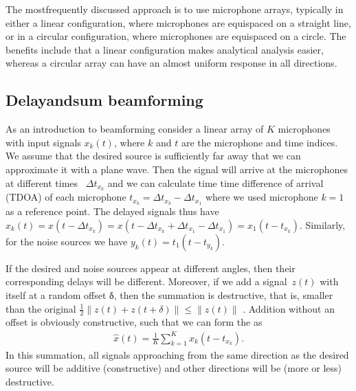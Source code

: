 \documentclass[letterpaper,10pt,english]{jupyterBook}
\begin{document}
\sphinxAtStartPar
The most\sphinxhyphen{}frequently discussed approach is to use microphone arrays,
typically in either a linear configuration, where microphones are
equi\sphinxhyphen{}spaced on a straight line, or in a circular configuration, where
microphones are equi\sphinxhyphen{}spaced on a circle. The benefits include that a
linear configuration makes analytical analysis easier, whereas a
circular array can have an almost uniform response in all directions.


\subsection{Delay\sphinxhyphen{}and\sphinxhyphen{}sum beamforming}
\label{\detokenize{Enhancement/Multi-channel_speech_enhancement_and_beamforming:delay-and-sum-beamforming}}
\sphinxAtStartPar
As an introduction to beamforming consider a linear array of \(K\)
microphones with input signals \(x_{k}(t)\), where \(k\) and \(t\) are
the microphone and time indices. We assume that the desired source is
sufficiently far away that we can approximate it with a plane wave. Then
the signal will arrive at the microphones at different times  \(
\Delta t_{x_k} \) and we can calculate time time difference of
arrival (TDOA) of each microphone \( t_{x_k} = \Delta
t_{x_k}-\Delta t_{x_1} \) where we used microphone \(k=1\) as a
reference point. The delayed signals thus have \( x_k(t) = x(t-\Delta
t_{x_k}) = x\left(t-\Delta t_{x_k}+\Delta t_{x_1} - \Delta
t_{x_1}\right) = x_1(t-t_{x_k}). \) Similarly, for the noise sources
we have \( y_k(t) = t_1(t-t_{y_k}). \)

\sphinxAtStartPar
If the desired and noise sources appear at different angles, then their
corresponding delays will be different. Moreover, if we add a
signal \(z(t)\) with itself at a random offset δ, then the summation is
destructive, that is, smaller than the original \(
\frac12\left\|z(t)+z(t+\delta)\right\| \leq \left\|z(t)\right\|
\) . Addition without an offset is obviously constructive, such that we
can form the  as
\begin{equation*}
\begin{split} \hat x(t) = \frac 1K \sum_{k=1}^K x_k(t-t_{x_k}). \end{split}
\end{equation*}
\sphinxAtStartPar
In this summation, all signals approaching from the same direction as
the desired source will be additive (constructive) and other directions
will be (more or less) destructive.
\end{document}
